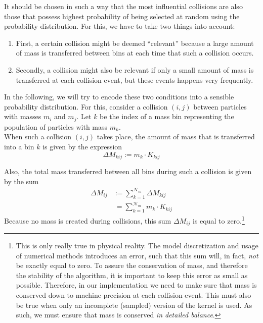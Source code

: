     It should be chosen in such a way that the most influential collisions are also those that 
    possess highest probability of being selected at random using the probability distribution. 
    For this, we have to take two things into account: 
    \begin{enumerate}
        \item First, a certain collision might be deemed ``relevant'' because a large amount of mass
              is transferred between bins at each time that such a collision occurs.
        \item Secondly, a collision might also be relevant if only a small amount of mass is
              transferred at each collision event, but these events happens very frequently.
    \end{enumerate}

    In the following, we will try to encode these two conditions into a sensible probability 
    distribution. 
    For this, consider a collision $(i, j)$ between particles with masses $m_i$ and $m_j$. 
    Let $k$ be the index of a mass bin representing the population of particles with mass $m_k$. \\

    When such a collision $(i, j)$ takes place, the amount of mass that is transferred into
    a bin $k$ is given by the expression 
    \begin{equation}
      \Delta M_{kij} := m_k \cdot K_{kij}
    \end{equation}

    Also, the total mass transferred between all bins during such a collision is given by the sum 
    \begin{align}
        \label{eq:total_mass_being_moved_between_bins_on_collision_ij}
        \Delta M_{ij} 
        &:= \sum_{k=1}^{\mathcal N_m} \Delta M_{kij} \\
        &\ = \sum_{k=1}^{\mathcal N_m} m_k \cdot K_{kij}
    \end{align}
    Because no mass is created during collisions, this sum $\Delta M_{ij}$ is equal to 
    zero.\footnote{ 
        This is only really true in physical reality.
        The model discretization and usage of numerical methods introduces an error, 
        such that this sum will, in fact, \textit{not} be exactly equal to zero. 
        To assure the conservation of mass, and therefore the stability of the algorithm, it is
        important to keep this error as small as possible. Therefore, in our implementation we need
        to make sure that mass is conserved down to machine precision at each collision event.
        This must also be true when only an incomplete (sampled) version of the kernel is 
        used. As such, we must ensure that mass is conserved \textit{in detailed balance}.
    } \\

